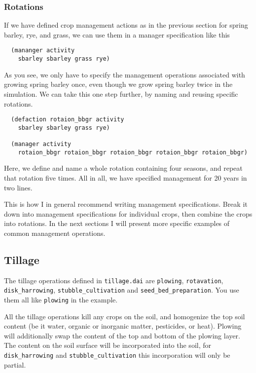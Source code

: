 \documentclass[a4paper,11pt]{article}
\begin{document}
\subsubsection{Rotations}
\label{sec:rotations}

If we have defined crop management actions as in the previous section
for spring barley, rye, and grass, we can use them in a
manager specification like this
\begin{verbatim}
  (mananger activity
    sbarley sbarley grass rye)
\end{verbatim}

As you see, we only have to specify the management operations
associated with growing spring barley once, even though we grow spring
barley twice in the simulation.  We can take this one step further, by
naming and reusing specific rotations.
\begin{verbatim}
  (defaction rotaion_bbgr activity
    sbarley sbarley grass rye)

  (manager activity
    rotaion_bbgr rotaion_bbgr rotaion_bbgr rotaion_bbgr rotaion_bbgr)
\end{verbatim}
Here, we define and name a whole rotation containing four seasons, and
repeat that rotation five times.  All in all, we have specified
management for 20 years in two lines.

This is how I in general recommend writing management specifications.
Break it down into management specifications for individual crops,
then combine the crops into rotations.  In the next sections I will
present more specific examples of common management operations.

\subsection{Tillage}
\label{sec:tillage}

The tillage operations defined in \texttt{tillage.dai} are
\texttt{plowing}, \texttt{rotavation}, \texttt{disk\_harrowing},
\texttt{stubble\_cultivation} and \texttt{seed\_bed\_preparation}.
You use them all like \texttt{plowing} in the example.

All the tillage operations kill any crops on the soil, and homogenize
the top soil content (be it water, organic or inorganic matter,
pesticides, or heat).  Plowing will additionally swap the content of
the top and bottom of the plowing layer.  The content on the soil
surface will be incorporated into the soil, for
\texttt{disk\_harrowing} and \texttt{stubble\_cultivation} this
incorporation will only be partial.
\end{document}
